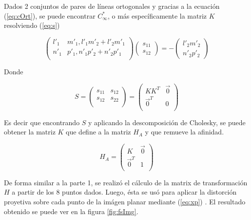 \documentclass{IEEEtran}
\begin{document}
Dados 2 conjuntos de pares de líneas ortogonales y gracias a la 
ecuación (\ref{eq:cOrt}), se puede encontrar $C^*_{\infty}$, o más 
específicamente la matriz $K$ 
resolviendo (\ref{eq:s}) 

\begin{equation}
\begin{pmatrix}
l'_1 & m'_1, l'_1 m'_2 + l'_2 m'_1 \\ 
n'_1 & p'_1, n'_1 p'_2 + n'_2 p'_1 \\
\end{pmatrix}
\begin{pmatrix}
s_{11} \\ s_{12}
\end{pmatrix}
= 
-
\begin{pmatrix}
l'_2 m'_2 \\ n'_2 p'_2
\end{pmatrix}
\label{eq:s}
\end{equation} 

Donde

\begin{equation}
S=
\begin{pmatrix}
s_{11} & s_{12} \\
s_{12} & s_{22} \\
\end{pmatrix}
=
\begin{pmatrix}
K K^T & \vec{0} \\
\vec{0}^T & 0 \\
\end{pmatrix}
\label{eq:sA}
\end{equation} 

Es decir que encontrando $S$ y aplicando la descomposición de Cholesky,
se puede obtener la matriz $K$ que define a la matriz $H_A$ y que remueve
la afinidad.

\begin{equation}
H_A=
\begin{pmatrix}
K & \vec{0} \\
\vec{0}^T & 1 \\
\end{pmatrix}
\label{eq:ha}
\end{equation} 

De forma similar a la parte 1, se realizó el cálculo de la matrix de 
transformación $H$ a partir de los 8 puntos dados. Luego, ésta se usó
para aplicar la distorción proyetiva sobre cada punto de la imágen planar 
mediante (\ref{eq:xp}) .
El resultado obtenido se puede ver en la figura \ref{fig:fsImg}.
\end{document}
